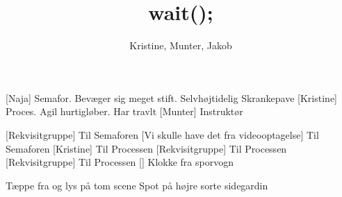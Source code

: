 \documentclass[a4paper,11pt]{article}
\title{wait();}
\author{Kristine, Munter, Jakob}
\begin{document}
\maketitle

\begin{roles}
	[Naja] Semafor. Bevæger sig meget stift. Selvhøjtidelig Skrankepave
	[Kristine] Proces. Agil hurtigløber. Har travlt
	[Munter] Instruktør
\end{roles}

\begin{props}
	[Rekvisitgruppe] Til Semaforen
	[Vi skulle have det fra videooptagelse] Til Semaforen
	[Kristine] Til Processen
        [Rekvisitgruppe] Til Processen
	[Rekvisitgruppe] Til Processen
	 Klokke fra sporvogn
\end{props}

\scene Tæppe fra og lys på tom scene
\scene Spot på højre sorte sidegardin
\end{document}
